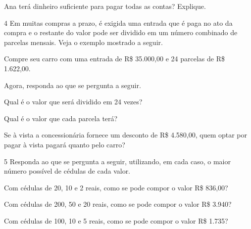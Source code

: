 \begin{mdframed}[linewidth=2pt,linecolor=salmao,roundcorner=2pt]
Ana terá dinheiro suficiente para pagar todas as contas? Explique.



\num{4} Em muitas compras a prazo, é exigida uma entrada que é paga no ato da
compra e o restante do valor pode ser dividido em um número combinado de
parcelas mensais. Veja o exemplo mostrado a seguir.

\begin{mdframed}[linewidth=2pt,linecolor=azul!20,backgroundcolor=azul!20,roundcorner=2pt]
Compre seu carro com uma entrada de R\$ 35.000,00 e 24
parcelas de R\$ 1.622,00.
\end{mdframed}

Agora, responda ao que se pergunta a seguir.

\begin{escolha}
\item
  Qual é o valor que será dividido em 24 vezes?

\item
  Qual é o valor que cada parcela terá?

\item
  Se à vista a concessionária fornece um desconto de R\$ 4.580,00, quem optar por pagar à vista pagará quanto pelo carro?
\end{escolha}

\num{5} Responda ao que se pergunta a seguir, utilizando, em cada caso, o maior número possível de cédulas de cada valor.

\begin{escolha}
\item Com cédulas de 20, 10 e 2 reais, como se pode compor o valor R\$ 836,00?

\item Com cédulas de 200, 50 e 20 reais, como se pode compor o valor R\$ 3.940?

\item Com cédulas de 100, 10 e 5 reais, como se pode compor o valor R\$ 1.735?
\end{escolha}


\end{mdframed}
